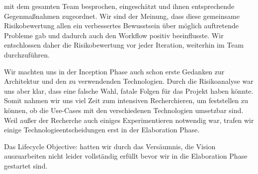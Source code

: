 \documentclass[10pt]{article}
\begin{document}
mit dem gesamten Team besprochen, eingeschätzt und ihnen entsprechende Gegenmaßnahmen zugeordnet.
Wir sind der Meinung, dass diese gemeinsame Risikobewertung allen
ein verbessertes Bewusstsein über möglich auftretende Probleme gab und dadurch auch den Workflow positiv beeinflusste.
Wir entschlossen daher die Risikobewertung vor jeder Iteration, weiterhin im Team durchzuführen. \par
\medskip
Wir machten uns in der Inception Phase auch schon erste Gedanken zur Architektur und den zu verwendenden Technologien.
Durch die Risikoanalyse war uns aber klar, dass eine falsche Wahl, fatale Folgen für das Projekt haben könnte.
Somit nahmen wir uns viel Zeit zum intensiven Recherchieren, um feststellen zu können, ob die Use-Cases mit den
verschiedenen Technologien umsetzbar sind. Weil außer der Recherche auch einiges Experimentieren notwendig war,
trafen wir einige Technologieentscheidungen erst in der Elaboration Phase.\par
\medskip
Das Lifecycle Objective:  hatten wir durch das Versäumnis, die Vision
auszuarbeiten nicht leider vollständig erfüllt bevor wir in die Elaboration Phase gestartet sind.

\newpage
\end{document}
